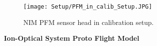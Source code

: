 		\begin{figure}[h] %
			\centering
			\texttt{[image: Setup/PFM\_in\_calib\_Setup.JPG]}
			\caption{NIM PFM sensor head in calibration setup.}
			\label{fig:SetupPFM}
		\end{figure}
		
		

		
		\textbf{Ion-Optical System Proto Flight Model}\\ %
		
		
	
